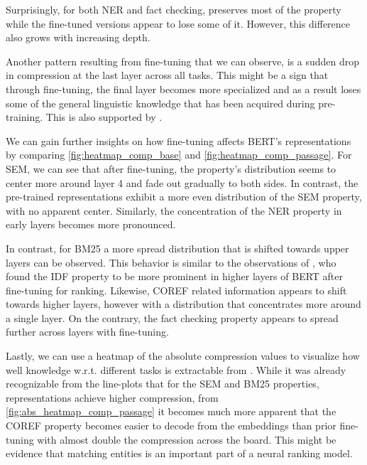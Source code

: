 Surprisingly, for both NER and fact checking,  preserves most of the property while the fine-tuned versions appear to lose some of it. However, this difference also grows with increasing depth.

Another pattern resulting from fine-tuning that we can observe, is a sudden drop in compression at the last layer across all tasks. This might be a sign that through fine-tuning, the final layer becomes more specialized and as a result loses some of the general linguistic knowledge that has been acquired during pre-training. This is also supported by \cite{merchant-etal-2020-happens}.

We can gain further insights on how fine-tuning affects BERT's representations by comparing \autoref{fig:heatmap_comp_base} and \autoref{fig:heatmap_comp_passage}. For SEM, we can see that after fine-tuning, the property's distribution seems to center more around layer 4 and fade out gradually to both sides. In contrast, the pre-trained representations exhibit a more even distribution of the SEM property, with no apparent center. Similarly, the concentration of the NER property in early layers becomes more pronounced.

In contrast, for BM25 a more spread distribution that is shifted towards upper layers can be observed. This behavior is similar to the observations of \cite{https://doi.org/10.48550/arxiv.2202.12191}, who found the IDF property to be more prominent in higher layers of BERT after fine-tuning for ranking. Likewise, COREF related information appears to shift towards higher layers, however with a distribution that concentrates more around a single layer. On the contrary, the fact checking property appears to spread further across layers with fine-tuning.

Lastly, we can use a heatmap of the absolute compression values to visualize how well knowledge w.r.t. different tasks is extractable from . While it was already recognizable from the line-plots that for the SEM and BM25 properties,  representations achieve higher compression, from \autoref{fig:abs_heatmap_comp_passage} it becomes much more apparent that the COREF property becomes easier to decode from the embeddings than prior fine-tuning with almost double the compression across the board. This might be evidence that matching entities is an important part of a neural ranking model.



